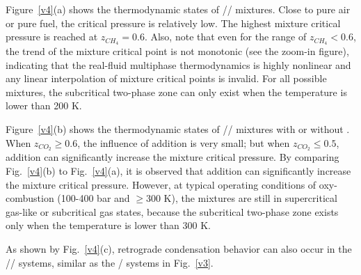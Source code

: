 Figure~\ref{v4}(a) shows the thermodynamic states of // mixtures. Close to pure air or pure fuel, the critical pressure is relatively low. The highest mixture critical pressure is reached %
at $z_{CH_4}=0.6$. Also, note that even for the range of $z_{CH_4}<0.6$, the trend of the mixture critical point is not monotonic (see the zoom-in figure), indicating that the real-fluid multiphase thermodynamics is highly nonlinear and any linear interpolation of mixture critical points is invalid. For all possible mixtures, the subcritical two-phase zone can only exist when the temperature is lower than 200 K. %

Figure~\ref{v4}(b) shows the thermodynamic states of // mixtures with or without . When $z_{CO_2}\geq0.6$, the influence of  addition is very small; but when $z_{CO_2}\leq0.5$,  addition can significantly increase the mixture critical pressure. By comparing Fig.~\ref{v4}(b) to Fig.~\ref{v4}(a), it is observed that  addition can significantly increase the mixture critical pressure. However, at typical operating conditions of  oxy-combustion (100-400 bar and $\ge300$ K), the mixtures are still in supercritical gas-like or subcritical gas states, because the subcritical two-phase zone exists only when the temperature is lower than 300 K.

As shown by Fig.~\ref{v4}(c), retrograde condensation behavior can also occur in the // systems, similar as the / systems in Fig.~\ref{v3}.

    
